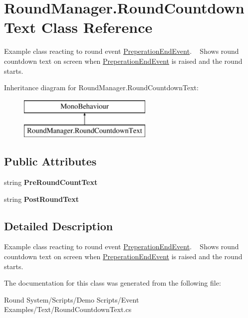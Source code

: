 \hypertarget{class_round_manager_1_1_round_countdown_text}{}\section{Round\+Manager.\+Round\+Countdown\+Text Class Reference}
\label{class_round_manager_1_1_round_countdown_text}


Example class reacting to round event \hyperlink{class_round_manager_1_1_events_1_1_preperation_end_event}{Preperation\+End\+Event}. ~\newline
Shows round countdown text on screen when \hyperlink{class_round_manager_1_1_events_1_1_preperation_end_event}{Preperation\+End\+Event} is raised and the round starts.  


Inheritance diagram for Round\+Manager.\+Round\+Countdown\+Text\+:\begin{figure}[H]
\begin{center}
\leavevmode
\includegraphics[height=2.000000cm]{class_round_manager_1_1_round_countdown_text}
\end{center}
\end{figure}
\subsection*{Public Attributes}
\begin{DoxyCompactItemize}
\item 
\hypertarget{class_round_manager_1_1_round_countdown_text_a0b8c6b20427e15ed1f8b1f569c175924}{}string {\bfseries Pre\+Round\+Count\+Text}\label{class_round_manager_1_1_round_countdown_text_a0b8c6b20427e15ed1f8b1f569c175924}

\item 
\hypertarget{class_round_manager_1_1_round_countdown_text_ae59123447db9a96d71e1f9c299e548eb}{}string {\bfseries Post\+Round\+Text}\label{class_round_manager_1_1_round_countdown_text_ae59123447db9a96d71e1f9c299e548eb}

\end{DoxyCompactItemize}


\subsection{Detailed Description}
Example class reacting to round event \hyperlink{class_round_manager_1_1_events_1_1_preperation_end_event}{Preperation\+End\+Event}. ~\newline
Shows round countdown text on screen when \hyperlink{class_round_manager_1_1_events_1_1_preperation_end_event}{Preperation\+End\+Event} is raised and the round starts. 



The documentation for this class was generated from the following file\+:\begin{DoxyCompactItemize}
\item 
Round System/\+Scripts/\+Demo Scripts/\+Event Examples/\+Text/Round\+Countdown\+Text.\+cs\end{DoxyCompactItemize}
